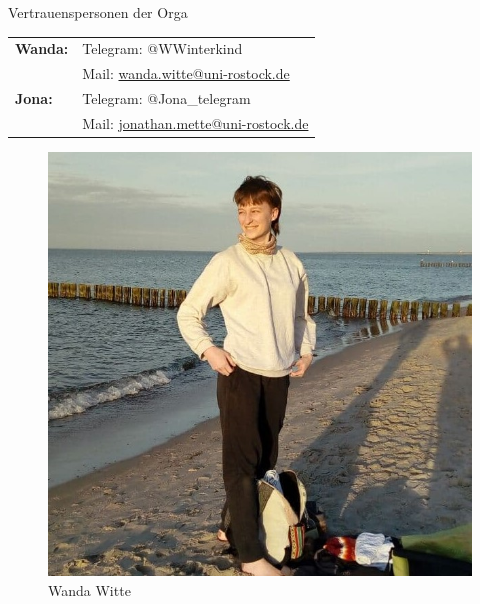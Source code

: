 \documentclass[compress, aspectratio=169]{beamer}
\begin{document}
\begin{frame}{Vertrauenspersonen der Orga}
\begin{tabular}{ll}
  \textbf{Wanda:}  &  Telegram: @WWinterkind \\
    & Mail: \url{wanda.witte@uni-rostock.de} \\

   \textbf{Jona:} & Telegram: @Jona\_telegram \\
  & Mail: \url{jonathan.mette@uni-rostock.de} \\
  
\end{tabular} 
\vspace{.5cm}

\hspace{0.1\textwidth}

\begin{minipage}{.3\textwidth}
	\begin{figure}
		\begin{minipage}[c]{.655\textwidth}
			\includegraphics[height=0.5\textheight]{wandaw.jpg}
		\end{minipage} \hfill
		\begin{minipage}[c]{.632\textwidth}
			\caption*{Wanda Witte}
		\end{minipage}
	\end{figure}
\end{minipage}

\end{frame}
\end{document}
